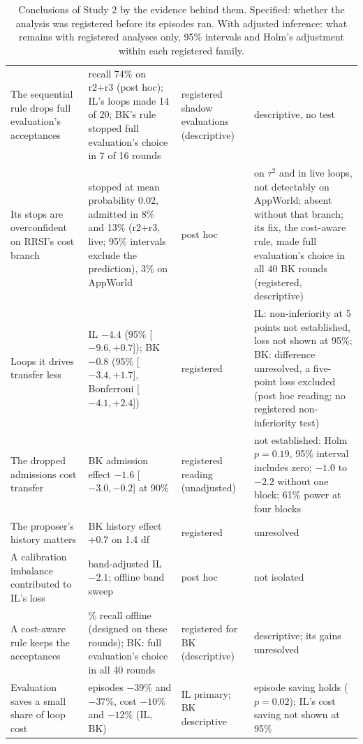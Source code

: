 \documentclass[11pt]{article}
\begin{document}
\begin{table}[t]
\begin{tabular}{@{}>{\raggedright\arraybackslash}p{4.0cm}>{\raggedright\arraybackslash}p{5.1cm}>{\raggedright\arraybackslash}p{2.6cm}>{\raggedright\arraybackslash}p{3.6cm}@{}}
The sequential rule drops full evaluation's acceptances & recall 74\% on r2+r3 (post hoc); IL's loops made 14 of 20; BK's rule stopped full evaluation's choice in 7 of 16 rounds & registered shadow evaluations (descriptive) & descriptive, no test \\
Its stops are overconfident on RRSI's cost branch & stopped at mean probability 0.02, admitted in 8\% and 13\% (r2+r3, live; 95\% intervals exclude the prediction), 3\% on AppWorld & post hoc & on $\tau^2$ and in live loops, not detectably on AppWorld; absent without that branch; its fix, the cost-aware rule, made full evaluation's choice in all 40 BK rounds (registered, descriptive) \\
Loops it drives transfer less & IL $-4.4$ (95\% [$-9.6,+0.7$]); BK $-0.8$ (95\% [$-3.4,+1.7$], Bonferroni [$-4.1,+2.4$]) & registered & IL: non-inferiority at 5 points not established, loss not shown at 95\%; BK: difference unresolved, a five-point loss excluded (post hoc reading; no registered non-inferiority test) \\
The dropped admissions cost transfer & BK admission effect $-1.6$ [$-3.0,-0.2$] at 90\% & registered reading (unadjusted) & not established: Holm $p=0.19$, 95\% interval includes zero; $-1.0$ to $-2.2$ without one block; 61\% power at four blocks \\
The proposer's history matters & BK history effect $+0.7$ on 1.4 df & registered & unresolved \\
A calibration imbalance contributed to IL's loss & band-adjusted IL $-2.1$; offline band sweep & post hoc & not isolated \\
A cost-aware rule keeps the acceptances & 88\% recall offline (designed on these rounds); BK: full evaluation's choice in all 40 rounds & registered for BK (descriptive) & descriptive; its gains unresolved \\
Evaluation saves a small share of loop cost & episodes $-39$\% and $-37$\%, cost $-10$\% and $-12$\% (IL, BK) & IL primary; BK descriptive & episode saving holds ($p=0.02$); IL's cost saving not shown at 95\% \\
\bottomrule
\end{tabular}
\caption{Conclusions of Study 2 by the evidence behind them. Specified: whether the analysis was registered before its episodes ran. With adjusted inference: what remains with registered analyses only, 95\% intervals and Holm's adjustment within each registered family.}
\label{tab:claims}
\end{table}
\end{document}
